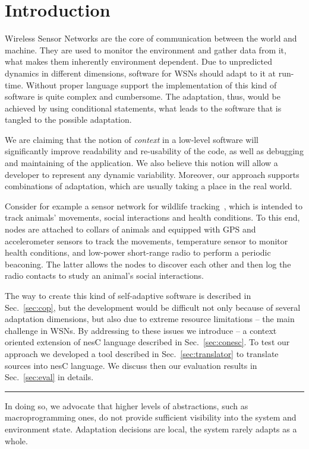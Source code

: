 \section{Introduction} 

Wireless Sensor Networks are the core of communication between the world and
machine. They are used to monitor the environment and gather data from it, what
makes them inherently environment dependent. Due to unpredicted dynamics in
different dimensions, software for WSNs should adapt to it at run-time. Without
proper language support the implementation of this kind of software is quite
complex and cumbersome. The adaptation, thus, would be achieved by using
conditional statements, what leads to the software that is tangled to the
possible adaptation.

We are claiming that the notion of \emph{context} in a low-level software will
significantly improve readability and re-usability of the code, as well as
debugging and maintaining of the application. We also believe this notion will
allow a developer to represent any dynamic variability. Moreover, our approach
supports combinations of adaptation, which are usually taking a place in the
real world.

Consider for example a sensor network for wildlife tracking~\cite{pasztor10},
which is intended to track animals' movements, social interactions and health
conditions. To this end, nodes are attached to collars of animals and equipped
with GPS and accelerometer sensors to track the movements, temperature sensor
to monitor health conditions, and low-power short-range radio to perform a
periodic beaconing. The latter allows the nodes to discover each other and then
log the radio contacts to study an animal's social interactions.

The way to create this kind of self-adaptive software is described in
Sec.~\ref{sec:cop}, but the development would be difficult not only because of
several adaptation dimensions, but also due to extreme resource limitations --
the main challenge in WSNs. By addressing to these issues we introduce \conesc
-- a context oriented extension of nesC language described in
Sec.~\ref{sec:conesc}. To test our approach we developed a tool described in
Sec.~\ref{sec:translator} to translate \conesc sources into nesC language. We
discuss then our evaluation results in Sec.~\ref{sec:eval} in details.

\hrule In doing so, we advocate that higher levels of abstractions,
such as macroprogramming ones, do not provide sufficient visibility
into the system and environment state. Adaptation decisions are local,
the system rarely adapts as a whole.
